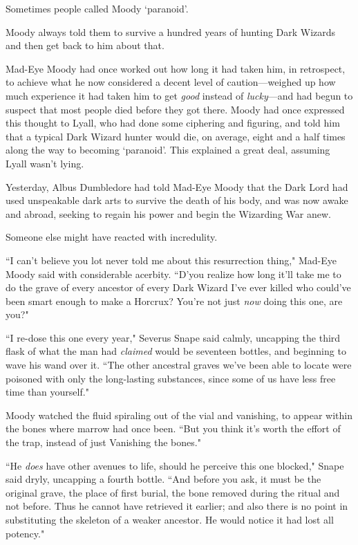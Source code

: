 Sometimes people called Moody `paranoid'.

Moody always told them to survive a hundred years of hunting Dark Wizards and then get back to him about that.

Mad-Eye Moody had once worked out how long it had taken him, in retrospect, to achieve what he now considered a decent level of caution---weighed up how much experience it had taken him to get \emph{good} instead of \emph{lucky}---and had begun to suspect that most people died before they got there. Moody had once expressed this thought to Lyall, who had done some ciphering and figuring, and told him that a typical Dark Wizard hunter would die, on average, eight and a half times along the way to becoming `paranoid'. This explained a great deal, assuming Lyall wasn't lying.

Yesterday, Albus Dumbledore had told Mad-Eye Moody that the Dark Lord had used unspeakable dark arts to survive the death of his body, and was now awake and abroad, seeking to regain his power and begin the Wizarding War anew.

Someone else might have reacted with incredulity.

``I can't believe you lot never told me about this resurrection thing," Mad-Eye Moody said with considerable acerbity. ``D'you realize how long it'll take me to do the grave of every ancestor of every Dark Wizard I've ever killed who could've been smart enough to make a Horcrux? You're not just \emph{now} doing this one, are you?"

``I re-dose this one every year," Severus Snape said calmly, uncapping the third flask of what the man had \emph{claimed} would be seventeen bottles, and beginning to wave his wand over it. ``The other ancestral graves we've been able to locate were poisoned with only the long-lasting substances, since some of us have less free time than yourself."

Moody watched the fluid spiraling out of the vial and vanishing, to appear within the bones where marrow had once been. ``But you think it's worth the effort of the trap, instead of just Vanishing the bones."

``He \emph{does} have other avenues to life, should he perceive this one blocked," Snape said dryly, uncapping a fourth bottle. ``And before you ask, it must be the original grave, the place of first burial, the bone removed during the ritual and not before. Thus he cannot have retrieved it earlier; and also there is no point in substituting the skeleton of a weaker ancestor. He would notice it had lost all potency."


